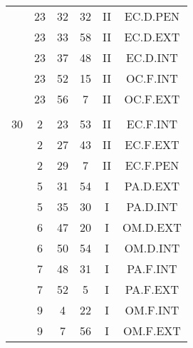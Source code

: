\documentclass[12pt, a4paper]{article}
\begin{document}
\begin{multicols}{3}
{\begin{tabular}{c c c c c c}
	 	 	 	 & 23 & 32 & 32 & II & EC.D.PEN\\%
	 	 	 	 & 23 & 33 & 58 & II & EC.D.EXT\\%
	 	 	 	 & 23 & 37 & 48 & II & EC.D.INT\\%
	 	 	 	 & 23 & 52 & 15 & II & OC.F.INT\\%
	 	 	 	 & 23 & 56 & 7 & II & OC.F.EXT\\%
	 	 	 	 & & & & & \\%
	 	 	 	30 & 2 & 23 & 53 & II & EC.F.INT\\%
	 	 	 	 & 2 & 27 & 43 & II & EC.F.EXT\\%
	 	 	 	 & 2 & 29 & 7 & II & EC.F.PEN\\%
	 	 	 	 & 5 & 31 & 54 & I & PA.D.EXT\\%
	 	 	 	 & 5 & 35 & 30 & I & PA.D.INT\\%
	 	 	 	 & 6 & 47 & 20 & I & OM.D.EXT\\%
	 	 	 	 & 6 & 50 & 54 & I & OM.D.INT\\%
	 	 	 	 & 7 & 48 & 31 & I & PA.F.INT\\%
	 	 	 	 & 7 & 52 & 5 & I & PA.F.EXT\\%
	 	 	 	 & 9 & 4 & 22 & I & OM.F.INT\\%
	 	 	 	 & 9 & 7 & 56 & I & OM.F.EXT\\%
	 	 \end{tabular}
 	}
\end{multicols}
\end{document}
